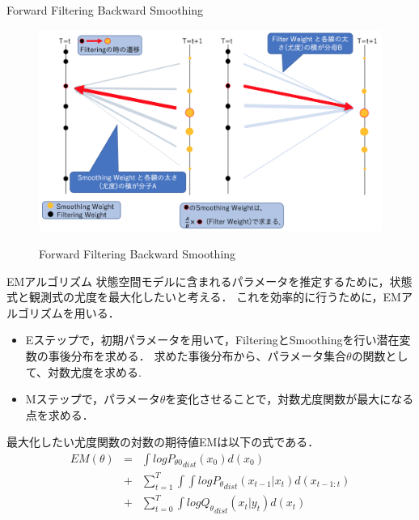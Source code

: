 \documentclass[dvipdfmx]{beamer}
\begin{document}
\begin{frame}{Forward Filtering Backward Smoothing}
\begin{figure}[h]
\begin{center}
  \includegraphics[scale=0.41]{figure/smoothing_img.png} \\
\label{fig:Em}
\end{center}
\caption{Forward Filtering Backward Smoothing}
\end{figure}
\end{frame}




\begin{frame}{EMアルゴリズム}
状態空間モデルに含まれるパラメータを推定するために，状態式と観測式の尤度を最大化したいと考える．
これを効率的に行うために，EMアルゴリズムを用いる．
\begin{itemize}
\item Eステップで，初期パラメータを用いて，FilteringとSmoothingを行い潜在変数の事後分布を求める．
求めた事後分布から、パラメータ集合$\theta$の関数として、対数尤度を求める.
\item Mステップで，パラメータ$\theta$を変化させることで，対数尤度関数が最大になる点を求める．
\end{itemize}
最大化したい尤度関数の対数の期待値EMは以下の式である．
\begin{eqnarray*}
EM(\theta)&=&\int log {P_{\theta0}}_{dist}(x_0)d(x_0)\\
&+&\sum_{t=1}^T \int\int log {P_{\theta}}_{dist}(x_{t-1}|x_{t})d(x_{t-1:t})\\
&+&\sum_{t=0}^T\int log {Q_{\theta}}_{dist}(x_t|y_t) d(x_t)
\end{eqnarray*}
\end{frame}
\end{document}
